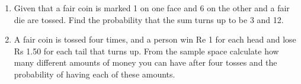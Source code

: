 \begin{enumerate}[label=\thechapter.\arabic*,ref=\thechapter.\theenumi]
	\item Given that a fair coin is marked 1 on one face and 6 on the other and a fair die are tossed. Find the probability that the sum turns up to be 3 and 12. 
		\\
		\solution
		
	\item A fair coin is tossed four times, and a person win Re 1 for each head and lose Rs 1.50 for each tail that turns up.
From the sample space calculate how many different amounts of money you can have after four tosses and the probability of having each of these amounts.\\
		\\
		\solution
		



\end{enumerate}
